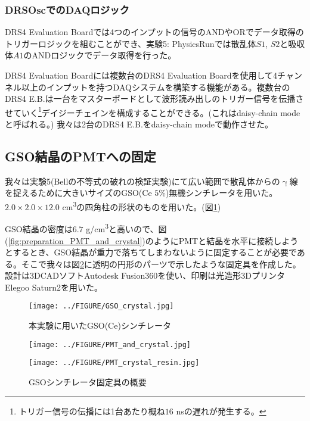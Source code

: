 \documentclass[../../main.tex]{subfiles}
\numberwithin{equation}{section}
\numberwithin{table}{section}
\numberwithin{figure}{section}
\begin{document}
\FloatBarrier
\subsubsection{DRSOscでのDAQロジック}
  DRS4 Evaluation Boardでは4つのインプットの信号のANDやORでデータ取得のトリガーロジックを組むことができ、実験5: PhysicsRunでは散乱体$S1$, $S2$と吸収体$A1$のANDロジックでデータ取得を行った。

  DRS4 Evaluation Boardには複数台のDRS4 Evaluation Boardを使用して4チャンネル以上のインプットを持つDAQシステムを構築する機能がある。複数台のDRS4 E.B.は一台をマスターボードとして波形読み出しのトリガー信号を伝播させていく\footnote{トリガー信号の伝播には1台あたり概ね$16$ nsの遅れが発生する。}デイジーチェインを構成することができる。(これはdaisy-chain modeと呼ばれる。) 我々は2台のDRS4 E.B.をdaisy-chain modeで動作させた。

\FloatBarrier
\subsection{GSO結晶のPMTへの固定}
我々は実験5(Bellの不等式の破れの検証実験)にて広い範囲で散乱体からの$\upgamma$線を捉えるために大きいサイズのGSO(Ce $5$\%)無機シンチレータを用いた。
$2.0\times2.0\times12.0$ \si{\centi\meter^3}の四角柱の形状のものを用いた。(図\ref{fig:preparation_GSO_crystal})

GSO結晶の密度は$6.7$ \si[per-mode=symbol]{\gram/\cubic\centi\meter}と高いので、図(\ref{fig:preparation_PMT_and_crystal})のようにPMTと結晶を水平に接続しようとするとき、GSO結晶が重力で落ちてしまわないように固定することが必要である。そこで我々は図\ref{fig:preparation_PMT_crystal_resin}に透明の円形のパーツで示したような固定具を作成した。設計は3DCADソフトAutodesk Fusion360を使い、印刷は光造形3DプリンタElegoo Saturn2を用いた。
\begin{figure}[H]
  \centering
  \texttt{[image: ../FIGURE/GSO\_crystal.jpg]}
  \caption{本実験に用いたGSO(Ce)シンチレータ}\label{fig:preparation_GSO_crystal}
\end{figure}

\begin{figure}[H]
  \begin{minipage}[b]{0.48\columnwidth}
    \centering
    \texttt{[image: ../FIGURE/PMT\_and\_crystal.jpg]}
    \label{fig:preparation_PMT_and_crystal}
  \end{minipage}
  \hspace{0.04\columnwidth} %
  \begin{minipage}[b]{0.48\columnwidth}
    \centering
    \texttt{[image: ../FIGURE/PMT\_crystal\_resin.jpg]}
    \label{fig:preparation_PMT_crystal_resin}
  \end{minipage}
  \caption{GSOシンチレータ固定具の概要}
\end{figure}
\end{document}
